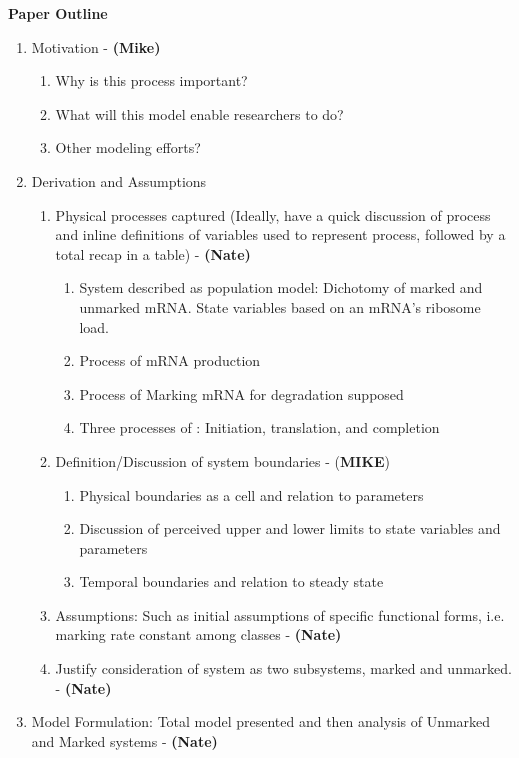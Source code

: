 \documentclass[review]{elsarticle}
\begin{document}
\textbf{Paper Outline}
\begin{enumerate}
\item Motivation - \textbf{(Mike)}
\begin{enumerate}
\item Why is this process important?
\item What will this model enable researchers to do?
\item Other modeling efforts?
\end{enumerate}
\item Derivation and Assumptions
\begin{enumerate}
\item Physical processes captured (Ideally, have a quick discussion of process and inline definitions of variables used to represent process, followed by a total recap in a table)  - \textbf{(Nate)}
\begin{enumerate}
\item System described as population model: Dichotomy of marked and unmarked mRNA.
State variables based on an mRNA's ribosome load.
\item Process of mRNA production
\item Process of Marking mRNA for degradation supposed
\item Three processes of : Initiation, translation, and completion
\end{enumerate}
\item Definition/Discussion of system boundaries - (\textbf{MIKE})
\begin{enumerate}
\item Physical boundaries as a cell and relation to parameters
\item Discussion of perceived upper and lower limits to state variables and parameters
\item Temporal boundaries and relation to steady state
\end{enumerate}
\item Assumptions: Such as initial assumptions of specific functional forms, i.e. marking rate constant among classes  - \textbf{(Nate)}
\item Justify consideration of system as two subsystems, marked and unmarked.  - \textbf{(Nate)}
\end{enumerate}
\item Model Formulation: Total model presented and then analysis of Unmarked and Marked systems  - \textbf{(Nate)}

\end{enumerate}
\end{document}
